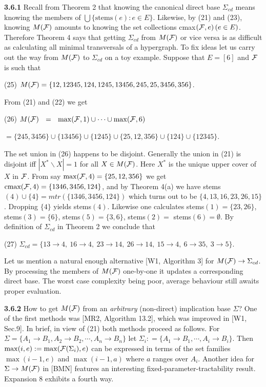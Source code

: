 \documentclass[11pt]{article}
\newcommand{\ra}{\rightarrow}
\begin{document}
{\bf 3.6.1} Recall from Theorem 2 that knowing the canonical direct base $\Sigma_{cd}$ means knowing the members of $\bigcup \{\mbox{stems}(e): e \in E\}$. Likewise, by (21) and (23), knowing $M({\cal F})$ amounts to knowing the set collections cmax$({\cal F},e)\, (e \in E)$. Therefore Theorem 4 says that getting $\Sigma_{cd}$ from $M({\cal F})$ or vice versa is as difficult as calculating all minimal transversals of a hypergraph. To fix ideas let us carry out the way from $M({\cal F})$ to $\Sigma_{cd}$ on a toy example. Suppose that $E = [6]$ and ${\cal F}$ is such that

(25) \quad $M({\cal F}) = \{12, 12345, 124, 1245, 13456, 245, 25, 3456, 356\}$.

From (21) and (22) we get

(26) \quad $M({\cal F}) \ \  =  \ \ \max ({\cal F},1) \cup \cdots \cup \max ({\cal F},6)$ 

\hspace*{2.2cm} $= \{245, 3456\} \cup \{13456\} \cup \{1245\} \cup \{25,12, 356\} \cup \{124\} \cup \{12345\}$.

The set union in (26) happens to be disjoint. Generally the union in (21) is disjoint iff $|X^\ast \backslash X| =1$ for all $X \in M({\cal F})$. Here $X^\ast$ is the unique upper cover of $X$ in ${\cal F}$. From say $\max ({\cal F}, 4) = \{25, 12, 356\}$ we get $\mbox{cmax}({\cal F}, 4) = \{1346, 3456, 124\}$, and by Theorem 4(a) we have stems$(4) \cup \{4\} = mtr(\{1346, 3456, 124\})$ which turns out to be $\{4, 13, 16, 23, 26, 15\}$. Dropping $\{4\}$ yields stems$(4)$. Likewise one calculates stems$(1) = \{23, 26\}$, stems$(3) = \{6\}$, stems$(5) = \{3, 6\}$, stems$(2) =$ stems$(6) = \emptyset$. By definition of $\Sigma_{cd}$ in Theorem 2 we conclude that

(27) \quad $\Sigma_{cd} = \{13 \ra 4, \ 16 \ra 4, \ 23 \ra 14, \ 26 \ra 14, \ 15 \ra 4, \  6 \ra 35, \ 3 \ra 5 \}$.

Let us mention a natural enough alternative [W1, Algorithm 3] for $M({\cal F}) \ra \Sigma_{cd}$. 
By processing the members of $M({\cal F})$ one-by-one it updates a corresponding direct base. The worst case complexity being poor, average behaviour still awaits proper evaluation.

{\bf 3.6.2}  How to get $M({\cal F})$ from an {\it arbitrary} (non-direct) implication base $\Sigma$?  One of the first methods was [MR2, Algorithm 13.2], which was improved in [W1, Sec.9]. 
In brief, in view of (21) both methods proceed as follows. For $\Sigma = \{A_1 \ra B_1, A_2 \ra B_2, \cdots, A_n \ra B_n\}$ let $\Sigma_i: = \{A_1 \ra B_1,\cdots, A_i \ra B_i \}$. Then $\max (i, e) : = \max ({\cal F}(\Sigma_i),e)$ can be expressed in terms of the set families $\max (i -1, e)$ and $\max (i-1, a)$ where $a$ ranges over $A_i$. Another idea for $\Sigma \ra M({\cal F})$ in [BMN] features an interesting fixed-parameter-tractability result.
Expansion 8 exhibits a fourth way.
\end{document}
